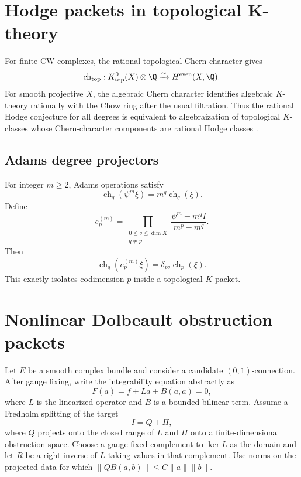 
\chapter{Hodge packets in topological K-theory}
For finite CW complexes, the rational topological Chern character gives
\[
\operatorname{ch}_{\mathrm{top}}:K^0_{\mathrm{top}}(X)\otimes\Q\xrightarrow{\sim}H^{\mathrm{even}}(X,\Q).
\]
For smooth projective $X$, the algebraic Chern character identifies algebraic $K$-theory rationally with the Chow ring after the usual filtration. Thus the rational Hodge conjecture for all degrees is equivalent to algebraization of topological $K$-classes whose Chern-character components are rational Hodge classes \cite{AtiyahHirzebruch}.

\section{Adams degree projectors}
For integer $m\ge2$, Adams operations satisfy
\[
\operatorname{ch}_q(\psi^m\xi)=m^q\operatorname{ch}_q(\xi).
\]
Define
\[
e_p^{(m)}=\prod_{\substack{0\le q\le\dim X\\q\ne p}}
\frac{\psi^m-m^qI}{m^p-m^q}.
\]
Then
\[
\operatorname{ch}_q(e_p^{(m)}\xi)=\delta_{pq}\operatorname{ch}_p(\xi).
\]
This exactly isolates codimension $p$ inside a topological $K$-packet.



\chapter{Nonlinear Dolbeault obstruction packets}
Let $E$ be a smooth complex bundle and consider a candidate $(0,1)$-connection. After gauge fixing, write the integrability equation abstractly as
\[
F(a)=f+La+B(a,a)=0,
\]
where $L$ is the linearized operator and $B$ is a bounded bilinear term. Assume a Fredholm splitting of the target
\[
I=Q+\Pi,
\]
where $Q$ projects onto the closed range of $L$ and $\Pi$ onto a finite-dimensional obstruction space. Choose a gauge-fixed complement to $\ker L$ as the domain and let $R$ be a right inverse of $L$ taking values in that complement. Use norms on the projected data for which $\|QB(a,b)\|\le C\|a\|\|b\|$.

